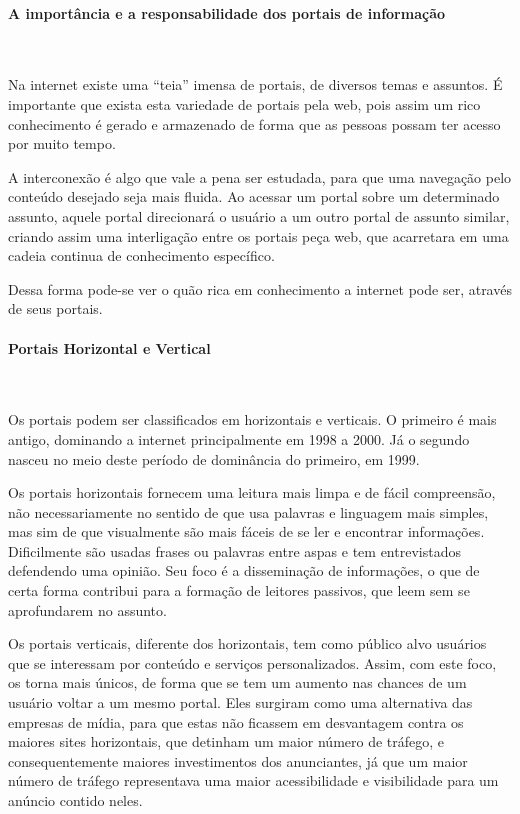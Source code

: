 \paragraph{A importância e a responsabilidade dos portais de informação}\mbox{}\\
\par
Na internet existe uma “teia” imensa de portais, de diversos temas e assuntos. É importante que exista esta variedade de portais pela web, pois assim um rico conhecimento é gerado e armazenado de forma que as pessoas possam ter acesso por muito tempo.

A interconexão é algo que vale a pena ser estudada, para que uma navegação pelo conteúdo desejado seja mais fluida. Ao acessar um portal sobre um determinado assunto, aquele portal direcionará o usuário a um outro portal de assunto similar, criando assim uma interligação entre os portais peça web, que acarretara em uma cadeia continua de conhecimento específico.

Dessa forma pode-se ver o quão rica em conhecimento a internet pode ser, através de seus portais.

\paragraph{Portais Horizontal e Vertical}\mbox{}\\
\par
Os portais podem ser classificados em horizontais e verticais. O primeiro é mais antigo, dominando a internet principalmente em 1998 a 2000. Já o segundo nasceu no meio deste período de dominância do primeiro, em 1999.

Os portais horizontais fornecem uma leitura mais limpa e de fácil compreensão, não necessariamente no sentido de que usa palavras e linguagem mais simples, mas sim de que visualmente são mais fáceis de se ler e encontrar informações. Dificilmente são usadas frases ou palavras entre aspas e tem entrevistados defendendo uma opinião. Seu foco é a disseminação de informações, o que de certa forma contribui para a formação de leitores passivos, que leem sem se aprofundarem no assunto.

Os portais verticais, diferente dos horizontais, tem como público alvo usuários que se interessam por conteúdo e serviços personalizados. Assim, com este foco, os torna mais únicos, de forma que se tem um aumento nas chances de um usuário voltar a um mesmo portal. Eles surgiram como uma alternativa das empresas de mídia, para que estas não ficassem em desvantagem contra os maiores sites horizontais, que detinham um maior número de tráfego, e consequentemente maiores investimentos dos anunciantes, já que um maior número de tráfego representava uma maior acessibilidade e visibilidade para um anúncio contido neles.

